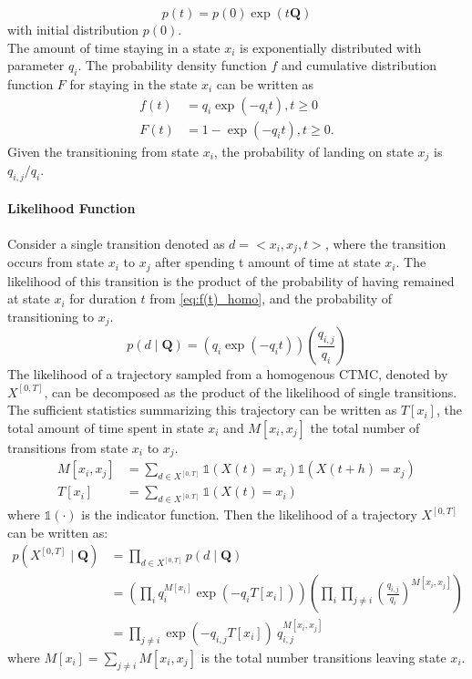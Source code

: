 \begin{equation}
p(t)=p(0) \exp (t\textbf{Q})
\label{eq:ode_sol}
\end{equation}
with initial distribution $ p(0) $.\\
The amount of time staying in a state $ x_{i} $ is exponentially distributed with parameter $ q_{i} $. The probability density function $ f $ and cumulative distribution function $ F $ for staying in the state $ x_{i} $ can be written as \cite{Nodelman1995}
\begin{align}
f(t) & = q_{i} \exp \left(-q_{i} t\right), t\geq 0  \label{eq:f(t)_homo}\\
F(t) & = 1 - \exp \left(-q_{i} t\right), t\geq 0 .
\end{align}
Given the transitioning from state $ x_{i} $, the probability of landing on state $ x_{j} $ is $ q_{i,j}/q_{i} $.
\paragraph*{Likelihood Function}
\label{sec:llh_of_homo}
Consider a single transition denoted as $ d = <x_{i},x_{j},t> $, where the transition occurs from state $ x_{i} $ to $ x_{j} $ after spending t amount of time at state $ x_{i} $. The likelihood of this transition is the product of the probability of having remained at state $ x_{i} $ for duration $ t $ from \autoref{eq:f(t)_homo}, and the probability of transitioning to $ x_{j} $.
\begin{equation}
p(d  \mid \textbf{Q}) = \left( q_{i}\exp(-q_{i}t) \right) \left( \frac{q_{i,j}}{q_{i}} \right)
\end{equation}
The likelihood of a trajectory sampled from a homogenous CTMC, denoted by $ X^{[0,T]} $, can be decomposed as the product of the likelihood of single transitions. The sufficient statistics summarizing this trajectory can be written as $ T[x_{i}] $, the total amount of time spent in state $ x_{i} $ and  $ M[x_{i}, x_{j}] $ the total number of transitions from state $ x_{i} $ to $ x_{j} $. 
\begin{align}
M[x_i,x_j] & = \sum_{d \in X^{[0,T]}} \mathbb{1}(X(t)=x_i)\mathbb{1}(X(t+h)=x_j)\\
T[x_i] &= \sum_{d \in X^{[0,T]}} \mathbb{1}(X(t)=x_i)
\end{align}
where $ \mathbb{1}(\cdot) $ is the indicator function. Then the likelihood of a trajectory $  X^{\left[0,T\right] } $ can be written as:
\begin{align}
p(X^{[0,T]}  \mid \textbf{Q}) &=  \prod_{d \in X^{[0,T]}} p(d \mid \textbf{Q}) \nonumber\\&=\left(\prod_{ i} q_{i}^{M[x_{i}]} \exp \left(-q_{i} T[x_{i}]\right)\right)\left(\prod_{ i} \prod_{ j \neq i} \left(\frac{q_{i,j}}{q_{i}}\right)^{M\left[x_{i}, x_{j}\right]}\right) \nonumber\\ & = \prod_{j \neq i}  \exp(-q_{i,j}T[x_{i}])\ q_{i,j}^{M[x_{i},x_{j}]}
\label{eq:lh_traj_homo}
\end{align}
where $ M[x_{i}] = \sum_{j \neq i} M[x_{i}, x_{j}] $ is the total number transitions leaving state $ x_{i} $.

